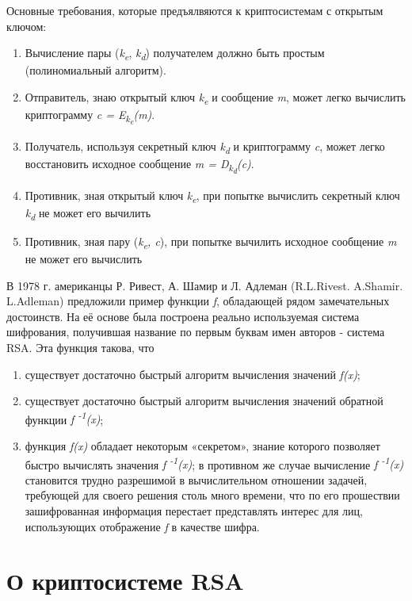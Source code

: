 Основные требования, которые предъялвяются к криптосистемам с открытым ключом:
\begin{enumerate}
	\item Вычисление пары (\textit{k\textsubscript{e}}, \textit{k\textsubscript{d}}) получателем должно быть простым (полиномиальный алгоритм).
	\item Отправитель, знаю открытый ключ \textit{k\textsubscript{e}} и сообщение \textit{m}, может легко вычислить криптограмму 
\textit{c = E\textsubscript{k\textsubscript{e}}(m)}.
	\item Получатель, используя секретный ключ \textit{k\textsubscript{d}} и криптограмму \textit{c}, может легко восстановить исходное сообщение 
\textit{m = D\textsubscript{k\textsubscript{d}}(c)}.
	\item Противник, зная открытый ключ \textit{k\textsubscript{e}}, при попытке вычислить секретный ключ \textit{k\textsubscript{d}} не может его 
вычилить
	\item Противник, зная пару (\textit{k\textsubscript{e}, c}), при попытке вычилить исходное сообщение \textit{m} не может его вычислить
\end{enumerate}

  В 1978 г. американцы Р. Ривест, А. Шамир и Л. Адлеман (R.L.Rivest. A.Shamir. L.Adleman) предложили пример функции \textit{f}, обладающей рядом 
замечательных достоинств. На её основе была построена реально используемая система шифрования, получившая название по первым буквам имен авторов - 
система RSA. Эта функция такова, что
\begin{enumerate}
    \item существует достаточно быстрый алгоритм вычисления значений \textit{f(x)};
    \item существует достаточно быстрый алгоритм вычисления значений обратной функции \textit{f\textsuperscript{ -1}(x)};
    \item функция \textit{f(x)} обладает некоторым «секретом», знание которого позволяет быстро вычислять значения \textit{f\textsuperscript{ -1}(x)};
в противном же случае вычисление \textit{f\textsuperscript{ -1}(x)} становится трудно разрешимой в вычислительном отношении задачей, требующей для 
своего решения столь много времени, что по его прошествии зашифрованная информация перестает представлять интерес для лиц, 
использующих отображение \textit{f} в качестве шифра.
\end{enumerate}	

\section{О криптосистеме RSA}


